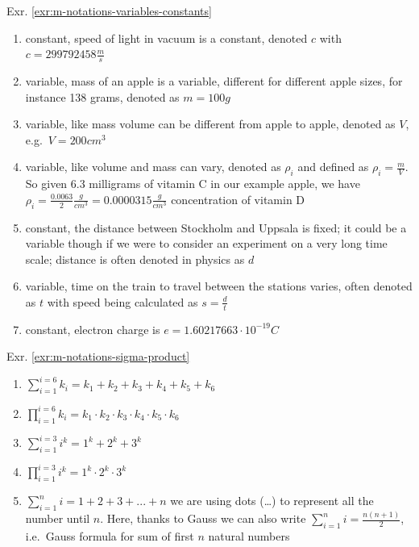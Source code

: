 \documentclass[
]{book}
\providecommand{\tightlist}{%
  \setlength{\itemsep}{0pt}\setlength{\parskip}{0pt}}
\theoremstyle{definition}
\theoremstyle{definition}
\theoremstyle{definition}
\theoremstyle{remark}
\begin{document}
Exr. \ref{exr:m-notations-variables-constants}

\begin{enumerate}
\def\labelenumi{\alph{enumi})}
\tightlist
\item
  constant, speed of light in vacuum is a constant, denoted \(c\) with \(c=299 792 458 \frac{m}{s}\)
\item
  variable, mass of an apple is a variable, different for different apple sizes, for instance 138 grams, denoted as \(m = 100 g\)
\item
  variable, like mass volume can be different from apple to apple, denoted as \(V\), e.g.~\(V = 200 cm^3\)
\item
  variable, like volume and mass can vary, denoted as \(\rho_i\) and defined as \(\rho_i=\frac{m}{V}\). So given 6.3 milligrams of vitamin C in our example apple, we have \(\rho_i=\frac{0.0063}{2}\frac{g}{cm^3} = 0.0000315 \frac{g}{cm^3}\) concentration of vitamin D
\item
  constant, the distance between Stockholm and Uppsala is fixed; it could be a variable though if we were to consider an experiment on a very long time scale; distance is often denoted in physics as \(d\)
\item
  variable, time on the train to travel between the stations varies, often denoted as \(t\) with speed being calculated as \(s = \frac{d}{t}\)
\item
  constant, electron charge is \(e = 1.60217663\cdot10^{-19} C\)
\end{enumerate}

Exr. \ref{exr:m-notations-sigma-product}

\begin{enumerate}
\def\labelenumi{\alph{enumi})}
\item
  \(\displaystyle \sum_{i=1}^{i=6}k_i = k_1 + k_2 + k_3 + k_4 + k_5 + k_6\)
\item
  \(\displaystyle \prod_{i=1}^{i=6}k_i = k_1 \cdot k_2 \cdot k_3 \cdot k_4 \cdot k_5 \cdot k_6\)
\item
  \(\displaystyle \sum_{i=1}^{i=3}i^k = 1^k + 2^k + 3^k\)
\item
  \(\displaystyle \prod_{i=1}^{i=3}i^k = 1^k \cdot 2^k \cdot 3^k\)
\item
  \(\displaystyle \sum_{i=1}^{n}i = 1 + 2 + 3 + ... + n\) we are using dots (\ldots) to represent all the number until \(n\). Here, thanks to Gauss we can also write \(\displaystyle \sum_{i=1}^{n}i = \frac{n(n+1)}{2}\), i.e.~Gauss formula for sum of first \(n\) natural numbers
\end{enumerate}
\end{document}
